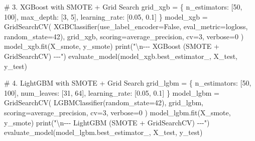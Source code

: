 \documentclass[
  letterpaper,
  DIV=11,
  numbers=noendperiod]{scrartcl}
\newenvironment{Shaded}{\begin{snugshade}}{\end{snugshade}}
\newcommand{\BuiltInTok}[1]{\textcolor[rgb]{0.00,0.23,0.31}{#1}}
\newcommand{\CharTok}[1]{\textcolor[rgb]{0.13,0.47,0.30}{#1}}
\newcommand{\CommentTok}[1]{\textcolor[rgb]{0.37,0.37,0.37}{#1}}
\newcommand{\DecValTok}[1]{\textcolor[rgb]{0.68,0.00,0.00}{#1}}
\newcommand{\FloatTok}[1]{\textcolor[rgb]{0.68,0.00,0.00}{#1}}
\newcommand{\NormalTok}[1]{\textcolor[rgb]{0.00,0.23,0.31}{#1}}
\newcommand{\OperatorTok}[1]{\textcolor[rgb]{0.37,0.37,0.37}{#1}}
\newcommand{\StringTok}[1]{\textcolor[rgb]{0.13,0.47,0.30}{#1}}
\newcommand{\VariableTok}[1]{\textcolor[rgb]{0.07,0.07,0.07}{#1}}
\begin{document}
\begin{Shaded}
\begin{Highlighting}[]
    \CommentTok{\# 3. XGBoost with SMOTE + Grid Search}
\NormalTok{    grid\_xgb }\OperatorTok{=}\NormalTok{ \{}
        \StringTok{\textquotesingle{}n\_estimators\textquotesingle{}}\NormalTok{: [}\DecValTok{50}\NormalTok{, }\DecValTok{100}\NormalTok{],}
        \StringTok{\textquotesingle{}max\_depth\textquotesingle{}}\NormalTok{: [}\DecValTok{3}\NormalTok{, }\DecValTok{5}\NormalTok{],}
        \StringTok{\textquotesingle{}learning\_rate\textquotesingle{}}\NormalTok{: [}\FloatTok{0.05}\NormalTok{, }\FloatTok{0.1}\NormalTok{]}
\NormalTok{    \}}
\NormalTok{    model\_xgb }\OperatorTok{=}\NormalTok{ GridSearchCV(}
\NormalTok{        XGBClassifier(use\_label\_encoder}\OperatorTok{=}\VariableTok{False}\NormalTok{, eval\_metric}\OperatorTok{=}\StringTok{\textquotesingle{}logloss\textquotesingle{}}\NormalTok{, random\_state}\OperatorTok{=}\DecValTok{42}\NormalTok{),}
\NormalTok{        grid\_xgb, scoring}\OperatorTok{=}\StringTok{\textquotesingle{}average\_precision\textquotesingle{}}\NormalTok{, cv}\OperatorTok{=}\DecValTok{3}\NormalTok{, verbose}\OperatorTok{=}\DecValTok{0}
\NormalTok{    )}
\NormalTok{    model\_xgb.fit(X\_smote, y\_smote)}
    \BuiltInTok{print}\NormalTok{(}\StringTok{"}\CharTok{\textbackslash{}n}\StringTok{{-}{-}{-} XGBoost (SMOTE + GridSearchCV) {-}{-}{-}"}\NormalTok{)}
\NormalTok{    evaluate\_model(model\_xgb.best\_estimator\_, X\_test, y\_test)}

    \CommentTok{\# 4. LightGBM with SMOTE + Grid Search}
\NormalTok{    grid\_lgbm }\OperatorTok{=}\NormalTok{ \{}
        \StringTok{\textquotesingle{}n\_estimators\textquotesingle{}}\NormalTok{: [}\DecValTok{50}\NormalTok{, }\DecValTok{100}\NormalTok{],}
        \StringTok{\textquotesingle{}num\_leaves\textquotesingle{}}\NormalTok{: [}\DecValTok{31}\NormalTok{, }\DecValTok{64}\NormalTok{],}
        \StringTok{\textquotesingle{}learning\_rate\textquotesingle{}}\NormalTok{: [}\FloatTok{0.05}\NormalTok{, }\FloatTok{0.1}\NormalTok{]}
\NormalTok{    \}}
\NormalTok{    model\_lgbm }\OperatorTok{=}\NormalTok{ GridSearchCV(}
\NormalTok{        LGBMClassifier(random\_state}\OperatorTok{=}\DecValTok{42}\NormalTok{), grid\_lgbm,}
\NormalTok{        scoring}\OperatorTok{=}\StringTok{\textquotesingle{}average\_precision\textquotesingle{}}\NormalTok{, cv}\OperatorTok{=}\DecValTok{3}\NormalTok{, verbose}\OperatorTok{=}\DecValTok{0}
\NormalTok{    )}
\NormalTok{    model\_lgbm.fit(X\_smote, y\_smote)}
    \BuiltInTok{print}\NormalTok{(}\StringTok{"}\CharTok{\textbackslash{}n}\StringTok{{-}{-}{-} LightGBM (SMOTE + GridSearchCV) {-}{-}{-}"}\NormalTok{)}
\NormalTok{    evaluate\_model(model\_lgbm.best\_estimator\_, X\_test, y\_test)}


\end{Highlighting}
\end{Shaded}
\end{document}
